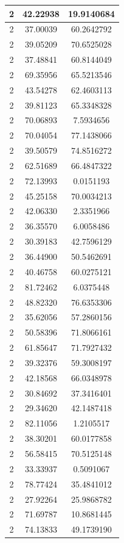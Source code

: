 \documentclass[
]{book}
\begin{document}
\begin{tabular}{c|c|c}
\hline
2 & 42.22938 & 19.9140684\\
\hline
2 & 37.00039 & 60.2642792\\
\hline
2 & 39.05209 & 70.6525028\\
\hline
2 & 37.48841 & 60.8144049\\
\hline
2 & 69.35956 & 65.5213546\\
\hline
2 & 43.54278 & 62.4603113\\
\hline
2 & 39.81123 & 65.3348328\\
\hline
2 & 70.06893 & 7.5934656\\
\hline
2 & 70.04054 & 77.1438066\\
\hline
2 & 39.50579 & 74.8516272\\
\hline
2 & 62.51689 & 66.4847322\\
\hline
2 & 72.13993 & 0.0151193\\
\hline
2 & 45.25158 & 70.0034213\\
\hline
2 & 42.06330 & 2.3351966\\
\hline
2 & 36.35570 & 6.0058486\\
\hline
2 & 30.39183 & 42.7596129\\
\hline
2 & 36.44900 & 50.5462691\\
\hline
2 & 40.46758 & 60.0275121\\
\hline
2 & 81.72462 & 6.0375448\\
\hline
2 & 48.82320 & 76.6353306\\
\hline
2 & 35.62056 & 57.2860156\\
\hline
2 & 50.58396 & 71.8066161\\
\hline
2 & 61.85647 & 71.7927432\\
\hline
2 & 39.32376 & 59.3008197\\
\hline
2 & 42.18568 & 66.0348978\\
\hline
2 & 30.84692 & 37.3416401\\
\hline
2 & 29.34620 & 42.1487418\\
\hline
2 & 82.11056 & 1.2105517\\
\hline
2 & 38.30201 & 60.0177858\\
\hline
2 & 56.58415 & 70.5125148\\
\hline
2 & 33.33937 & 0.5091067\\
\hline
2 & 78.77424 & 35.4841012\\
\hline
2 & 27.92264 & 25.9868782\\
\hline
2 & 71.69787 & 10.8681445\\
\hline
2 & 74.13833 & 49.1739190\\

\end{tabular}
\end{document}
